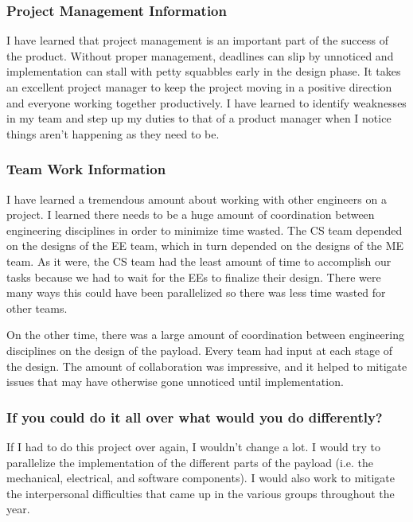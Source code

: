 \subsubsection{Project Management Information}
I have learned that project management is an important part of the success of
the product.
Without proper management, deadlines can slip by unnoticed and implementation
can stall with petty squabbles early in the design phase.
It takes an excellent project manager to keep the project moving in a positive
direction and everyone working together productively.
I have learned to identify weaknesses in my team and step up my duties to that
of a product manager when I notice things aren't happening as they need to be.

\subsubsection{Team Work Information}
I have learned a tremendous amount about working with other engineers on a
project.
I learned there needs to be a huge amount of coordination between engineering
disciplines in order to minimize time wasted.
The CS team depended on the designs of the EE team, which in turn depended on
the designs of the ME team.
As it were, the CS team had the least amount of time to accomplish our tasks
because we had to wait for the EEs to finalize their design.
There were many ways this could have been parallelized so there was less time
wasted for other teams.

On the other time, there was a large amount of coordination between engineering
disciplines on the design of the \gls{payload}.
Every team had input at each stage of the design.
The amount of collaboration was impressive, and it helped to mitigate issues
that may have otherwise gone unnoticed until implementation.

\subsubsection{If you could do it all over what would you do differently?}
If I had to do this project over again, I wouldn't change a lot.
I would try to parallelize the implementation of the different parts of the 
\gls{payload} (i.e. the mechanical, electrical, and software components).
I would also work to mitigate the interpersonal difficulties that came up in
the various groups throughout the year.
